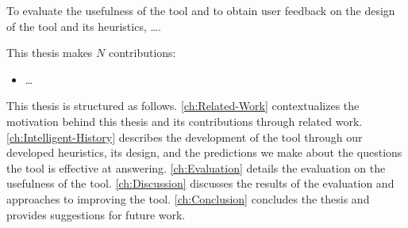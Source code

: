 To evaluate the usefulness of the tool and to obtain user feedback on the design of the tool and its heuristics, \dots {}.

This thesis makes $N$ contributions:
\begin{itemize}
	\item \dots {}
\end{itemize}

This thesis is structured as follows. 
\autoref{ch:Related-Work} contextualizes the motivation behind this thesis and its contributions through related work. 
\autoref{ch:Intelligent-History} describes the development of the tool through our developed heuristics, its design, and the predictions we make about the questions the tool is effective at answering. 
\autoref{ch:Evaluation} details the evaluation on the usefulness of the tool.
\autoref{ch:Discussion} discusses the results of the evaluation and approaches to improving the tool.
\autoref{ch:Conclusion} concludes the thesis and provides suggestions for future work.

\endinput

Any text after an \endinput is ignored.
You could put scraps here or things in progress.
